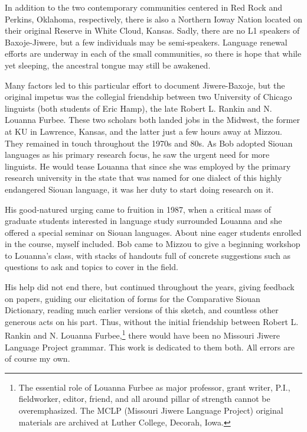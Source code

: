 \documentclass[output=paper]{LSP/langsci}
\begin{document}
In addition to the two contemporary communities centered in Red Rock and Perkins, Oklahoma, respectively, there is also a Northern Ioway Nation located on their original Reserve in White Cloud, Kansas.  Sadly, there are no L1 speakers of Baxoje-Jiwere, but a few individuals may be semi-speakers.  Language renewal efforts are underway in each of the small communities, so there is hope that while yet sleeping, the ancestral tongue may still be awakened.    

Many factors led to this particular effort to document Jiwere-Baxoje, but the original impetus was the collegial friendship between two University of Chicago linguists (both students of Eric Hamp), the late Robert L. Rankin and N. Louanna Furbee. These two scholars both landed jobs in the Midwest, the former at KU in Lawrence, Kansas, and the latter just a few hours away at Mizzou.  They remained in touch throughout the 1970s and 80s.  As Bob adopted Siouan languages as his primary research focus, he saw the urgent need for more linguists. He would tease Louanna that since she was employed by the primary research university in the state that was named for one dialect of this highly endangered Siouan language, it was her duty to start doing research on it.  

His good-natured urging came to fruition in 1987, when a critical mass of graduate students interested in language study surrounded Louanna and she offered a special seminar on Siouan languages.  About nine eager students enrolled in the course, myself included.  Bob came to Mizzou to give a beginning workshop to Louanna's class, with stacks of handouts full of concrete suggestions such as questions to ask and topics to cover in the field.  

His help did not end there, but continued throughout the years, giving feedback on papers, guiding our elicitation of forms for the Comparative Siouan Dictionary, reading much earlier versions of this sketch, and countless other generous acts on his part. Thus, without the initial friendship between Robert L. Rankin and N. Louanna Furbee,\footnote{The essential role of Louanna Furbee as major professor, grant writer, P.I., fieldworker, editor, friend, and all around pillar of strength cannot be overemphasized. The MCLP (Missouri Jiwere Language Project) original materials are archived at Luther College, Decorah, Iowa.} there would have been no Missouri Jiwere Language Project grammar.  This work is dedicated to them both.  All errors are of course my own.  
\end{document}
